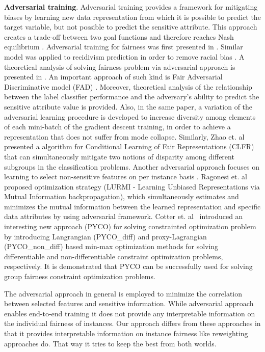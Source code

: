 \documentclass[preprint,12pt]{elsarticle}
\begin{document}
\textbf{Adversarial training}. Adversarial training provides a framework for mitigating biases by learning new data representation from which it is possible to predict the target variable, but not possible to predict the sensitive attribute. This approach creates a trade-off between two goal functions and therefore reaches Nash equilibrium \cite{goodfellow2014generative}.
Adversarial training for fairness was first presented in \cite{zhang2018mitigating}. Similar model was applied to recidivism prediction in order to remove racial bias \cite{wadsworth2018achieving}.
A theoretical analysis of solving fairness problem via adversarial approach is presented in \cite{madras2018learning}.
An important approach of such kind is Fair Adversarial Discriminative model (FAD) \cite{adel2019one}. Moreover, theoretical analysis of the relationship between the label classifier performance and the adversary’s ability to predict the sensitive attribute value is provided. Also, in the same paper, a variation of the adversarial learning procedure is developed to increase diversity among elements of each mini-batch of the gradient descent training, in order to achieve a representation that does not suffer from mode collapse. Similarly, Zhao et. al~\cite{zhao2019conditional} presented a algorithm for Conditional Learning of Fair Representations (CLFR) that can simultaneously mitigate two notions of disparity among different subgroups in the classification problems.
Another adversarial approach focuses on learning to select non-sensitive features on per instance basis \cite{wang2019approaching}. 
Ragonesi et. al~\cite{ragonesi2021learning} proposed optimization strategy (LURMI - Learning Unbiased Representations via Mutual Information backpropagation), which simultaneously estimates and minimizes the mutual information between the learned representation and specific data attributes by using adversarial framework.
Cotter et. al~\cite{cotter2019optimization} introduced an interesting new approach (PYCO) for solving constrainted optimization problem by introducing Langrangian (PYCO\_diff) and proxy-Lagrangian (PYCO\_non\_diff) based min-max optimization methods for solving differentiable and non-differentiable constraint optimization problems, respectively. It is demonstrated that PYCO can be successfully used for solving group fairness constraint optimization problems.

The adversarial approach in general is employed to minimize the correlation between selected features and sensitive information. While adversarial approach enables end-to-end training it does not provide any interpretable information on the individual fairness of instances. Our approach differs from these approaches in that it provides interpretable information on instance fairness like reweighting approaches do. That way it tries to keep the best from both worlds.
\end{document}
